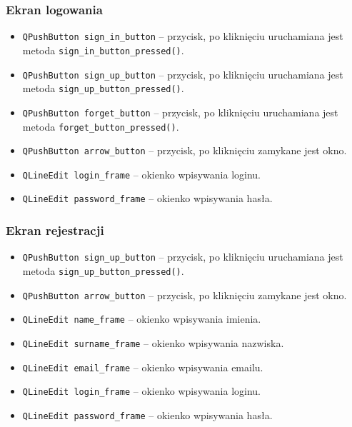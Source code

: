 \documentclass[a4paper]{article}
\newcommand{\prog}{\texttt}
\begin{document}
\subsubsection{Ekran logowania}
\begin{itemize}
    \item \prog{QPushButton sign\_in\_button} -- przycisk, po kliknięciu uruchamiana jest metoda \prog{sign\_in\_button\_pressed()}.
    \item \prog{QPushButton sign\_up\_button} -- przycisk, po kliknięciu uruchamiana jest metoda \prog{sign\_up\_button\_pressed()}.
    \item \prog{QPushButton forget\_button} -- przycisk, po kliknięciu uruchamiana jest metoda \prog{forget\_button\_pressed()}.
    \item \prog{QPushButton arrow\_button} -- przycisk, po kliknięciu zamykane jest okno.
    \item \prog{QLineEdit login\_frame} -- okienko wpisywania loginu.
    \item \prog{QLineEdit password\_frame} -- okienko wpisywania hasła.
\end{itemize}

\subsubsection{Ekran rejestracji}
\begin{itemize}
    \item \prog{QPushButton sign\_up\_button} -- przycisk, po kliknięciu uruchamiana jest metoda \prog{sign\_up\_button\_pressed()}.
    \item \prog{QPushButton arrow\_button} -- przycisk, po kliknięciu zamykane jest okno.
    \item \prog{QLineEdit name\_frame} -- okienko wpisywania imienia.
    \item \prog{QLineEdit surname\_frame} -- okienko wpisywania nazwiska.
    \item \prog{QLineEdit email\_frame} -- okienko wpisywania emailu.
    \item \prog{QLineEdit login\_frame} -- okienko wpisywania loginu.
    \item \prog{QLineEdit password\_frame} -- okienko wpisywania hasła.
\end{itemize}
\end{document}
